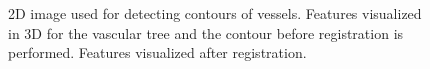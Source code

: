 \documentclass{article}[a4]
\begin{document}
\begin{figure}[tbp]
  \centering
  \hfill
  \hfill
  \hfill
  \hfill
  \caption{\protect{} 2D image used for detecting
    contours of vessels. \protect{} Features
    visualized in 3D for the vascular tree and the contour before
    registration is performed. \protect{} Features
    visualized after registration.}
  \label{fig:fig2}
\end{figure}
\end{document}

